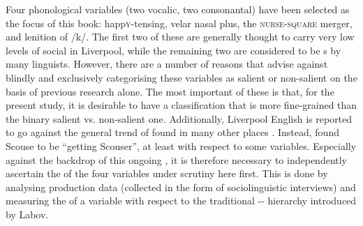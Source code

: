 Four phonological variables (two vocalic, two consonantal) have been selected as the focus of this book: happ\textsc{y}-tensing, velar nasal plus, the \textsc{nurse}-\textsc{square} merger, and lenition of /k/.
The first two of these are generally thought to carry very low levels of social  in Liverpool, while the remaining two are considered to be s by many linguists.
However, there are a number of reasons that advise against blindly and exclusively categorising these variables as salient or non-salient on the basis of previous research alone.
The most important of these is that, for the present study, it is desirable to have a classification that is more fine-grained than the binary salient vs. non-salient one.
Additionally, Liverpool English is reported to go against the general trend of  found in many other places \parencite{kerswill2003}.
Instead, \textcite[237]{watson2007a} found Scouse to be ``getting Scouser'', at least with respect to some variables.
Especially against the backdrop of this ongoing , it is therefore necessary to independently ascertain the  of the four variables under scrutiny here first.
This is done by analysing production data (collected in the form of sociolinguistic interviews) and measuring the  of a variable with respect to the traditional -- hierarchy introduced by Labov.

